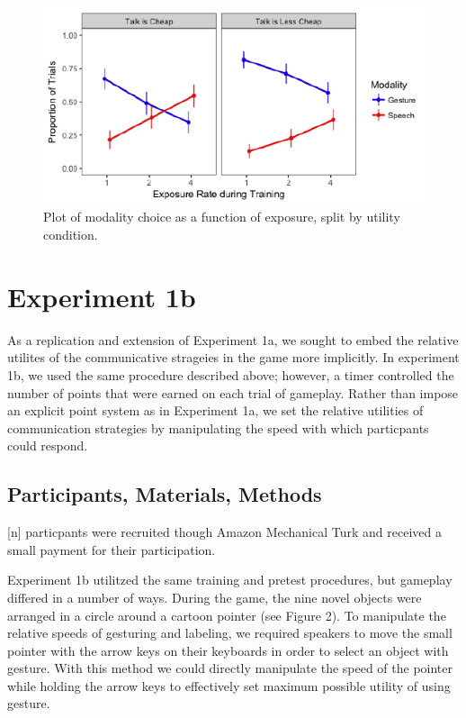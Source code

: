 \documentclass[10pt, letterpaper]{article}
\newenvironment{CodeChunk}{}{}
\begin{document}
\begin{CodeChunk}
\captionsetup{width=0.8\columnwidth}\begin{figure}[H]

{\centering \includegraphics{figs/image1-1} 

}

\caption[Plot of modality choice as a function of exposure, split by utility condition]{Plot of modality choice as a function of exposure, split by utility condition.}\label{fig:image1}
\end{figure}
\end{CodeChunk}

\section{Experiment 1b}\label{experiment-1b}

As a replication and extension of Experiment 1a, we sought to embed the
relative utilites of the communicative strageies in the game more
implicitly. In experiment 1b, we used the same procedure described
above; however, a timer controlled the number of points that were earned
on each trial of gameplay. Rather than impose an explicit point system
as in Experiment 1a, we set the relative utilities of communication
strategies by manipulating the speed with which particpants could
respond.

\subsection{Participants, Materials,
Methods}\label{participants-materials-methods-1}

{[}n{]} particpants were recruited though Amazon Mechanical Turk and
received a small payment for their participation.

Experiment 1b utilitzed the same training and pretest procedures, but
gameplay differed in a number of ways. During the game, the nine novel
objects were arranged in a circle around a cartoon pointer (see Figure
2). To manipulate the relative speeds of gesturing and labeling, we
required speakers to move the small pointer with the arrow keys on their
keyboards in order to select an object with gesture. With this method we
could directly manipulate the speed of the pointer while holding the
arrow keys to effectively set maximum possible utility of using gesture.
\end{document}
